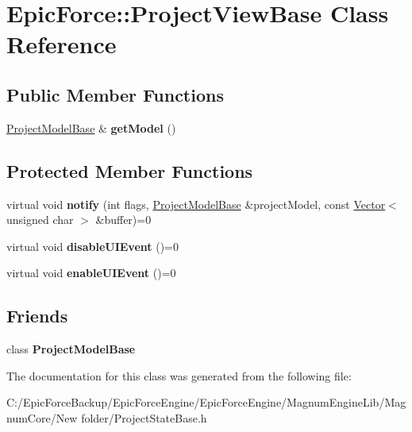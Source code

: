 \hypertarget{class_epic_force_1_1_project_view_base}{}\section{Epic\+Force\+:\+:Project\+View\+Base Class Reference}
\label{class_epic_force_1_1_project_view_base}
\subsection*{Public Member Functions}
\begin{DoxyCompactItemize}
\item 
\hyperlink{class_epic_force_1_1_project_model_base}{Project\+Model\+Base} \& {\bfseries get\+Model} ()\hypertarget{class_epic_force_1_1_project_view_base_aee4bf623e8dc5d80025b4bda6ce934cd}{}\label{class_epic_force_1_1_project_view_base_aee4bf623e8dc5d80025b4bda6ce934cd}

\end{DoxyCompactItemize}
\subsection*{Protected Member Functions}
\begin{DoxyCompactItemize}
\item 
virtual void {\bfseries notify} (int flags, \hyperlink{class_epic_force_1_1_project_model_base}{Project\+Model\+Base} \&project\+Model, const \hyperlink{class_magnum_1_1_vector}{Vector}$<$ unsigned char $>$ \&buffer)=0\hypertarget{class_epic_force_1_1_project_view_base_aca209fb84f6eb568e0f7abc657de416d}{}\label{class_epic_force_1_1_project_view_base_aca209fb84f6eb568e0f7abc657de416d}

\item 
virtual void {\bfseries disable\+U\+I\+Event} ()=0\hypertarget{class_epic_force_1_1_project_view_base_ac9c36ecd388529ae01c76998dde005b8}{}\label{class_epic_force_1_1_project_view_base_ac9c36ecd388529ae01c76998dde005b8}

\item 
virtual void {\bfseries enable\+U\+I\+Event} ()=0\hypertarget{class_epic_force_1_1_project_view_base_ac3edbf1e19399f78399f6b7d95da9e24}{}\label{class_epic_force_1_1_project_view_base_ac3edbf1e19399f78399f6b7d95da9e24}

\end{DoxyCompactItemize}
\subsection*{Friends}
\begin{DoxyCompactItemize}
\item 
class {\bfseries Project\+Model\+Base}\hypertarget{class_epic_force_1_1_project_view_base_a4adee89a75f9facb060d3c44ba6db2ed}{}\label{class_epic_force_1_1_project_view_base_a4adee89a75f9facb060d3c44ba6db2ed}

\end{DoxyCompactItemize}


The documentation for this class was generated from the following file\+:\begin{DoxyCompactItemize}
\item 
C\+:/\+Epic\+Force\+Backup/\+Epic\+Force\+Engine/\+Epic\+Force\+Engine/\+Magnum\+Engine\+Lib/\+Magnum\+Core/\+New folder/Project\+State\+Base.\+h\end{DoxyCompactItemize}
